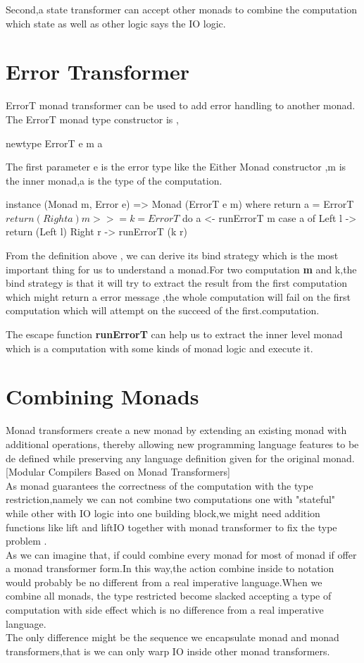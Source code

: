 Second,a state transformer can accept other monads to combine the computation which state as well as other logic says the IO logic.


\section{Error Transformer}
ErrorT monad transformer can be used to add error handling to another monad.
The ErrorT monad type constructor is ,
\begin{hcode}
newtype ErrorT e m a
\end{hcode}
The first parameter e is the error type like the Either Monad constructor ,m is the inner monad,a is the type of the computation.

\begin{hcode}
instance (Monad m, Error e) => Monad (ErrorT e m) where
    return a = ErrorT $ return (Right a)
    m >>= k  = ErrorT $ do
        a <- runErrorT m
        case a of
            Left  l -> return (Left l)
            Right r -> runErrorT (k r)
\end{hcode}

From the definition above , we can derive its bind strategy which is the most important thing for us to understand a monad.For two computation \textbf{m} and {k},the bind strategy is  that it will try to extract the result from the first computation which might return a error message ,the whole computation will fail on the first computation which will attempt on the succeed of the first.computation.

The escape function \textbf{runErrorT} can help us to extract the inner level monad which is a computation with some kinds of monad logic and execute it.

\section{Combining Monads}
Monad transformers create a new monad by extending an existing monad with additional operations, thereby allowing new programming language features to be de defined while preserving any language definition given for the original monad.[Modular Compilers Based on Monad Transformers]\\ 

As monad guarantees the correctness of the computation with the type restriction,namely we can not combine two computations one with "stateful" while other with IO logic into one building block,we might need addition functions like lift and liftIO together with monad transformer to fix the type problem .\\


As we can imagine that, if could combine every monad for most of monad if offer a monad transformer form.In this way,the action combine inside to notation would probably be no different from a real imperative language.When we combine all monads, the type restricted become slacked accepting a type of computation with side effect which is no difference from a real imperative language.\\

The only difference might be the sequence we encapsulate monad and monad transformers,that is we can only warp IO inside other monad transformers.
